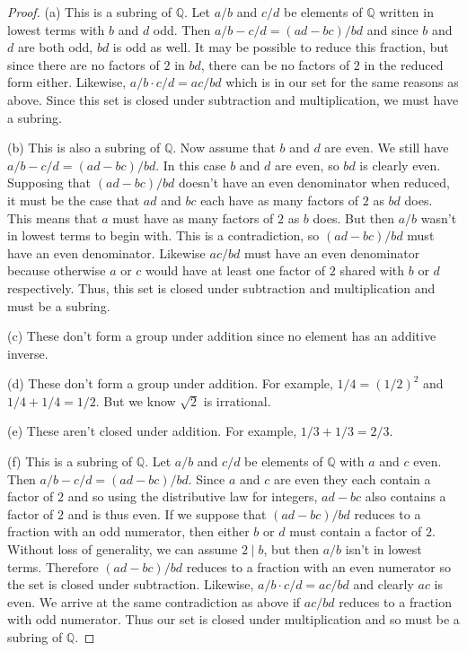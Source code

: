 \documentclass{article}
\begin{document}
\begin{proof}
(a) This is a subring of $\mathbb{Q}$. Let $a/b$ and $c/d$ be elements of $\mathbb{Q}$ written in lowest terms with $b$ and $d$ odd. Then $a/b - c/d = (ad-bc)/bd$ and since $b$ and $d$ are both odd, $bd$ is odd as well. It may be possible to reduce this fraction, but since there are no factors of $2$ in $bd$, there can be no factors of $2$ in the reduced form either. Likewise, $a/b \cdot c/d = ac/bd$ which is in our set for the same reasons as above. Since this set is closed under subtraction and multiplication, we must have a subring.

(b) This is also a subring of $\mathbb{Q}$. Now assume that $b$ and $d$ are even. We still have $a/b - c/d = (ad-bc)/bd$. In this case $b$ and $d$ are even, so $bd$ is clearly even. Supposing that $(ad-bc)/bd$ doesn't have an even denominator when reduced, it must be the case that $ad$ and $bc$ each have as many factors of $2$ as $bd$ does. This means that $a$ must have as many factors of $2$ as $b$ does. But then $a/b$ wasn't in lowest terms to begin with. This is a contradiction, so $(ad-bc)/bd$ must have an even denominator. Likewise $ac/bd$ must have an even denominator because otherwise $a$ or $c$ would have at least one factor of $2$ shared with $b$ or $d$ respectively. Thus, this set is closed under subtraction and multiplication and must be a subring.

(c) These don't form a group under addition since no element has an additive inverse.

(d) These don't form a group under addition. For example, $1/4 = (1/2)^2$ and $1/4 + 1/4 = 1/2$. But we know $\sqrt{2}$ is irrational.

(e) These aren't closed under addition. For example, $1/3 + 1/3 = 2/3$.

(f) This is a subring of $\mathbb{Q}$. Let $a/b$ and $c/d$ be elements of $\mathbb{Q}$ with $a$ and $c$ even. Then $a/b-c/d = (ad-bc)/bd$. Since $a$ and $c$ are even they each contain a factor of $2$ and so using the distributive law for integers, $ad-bc$ also contains a factor of $2$ and is thus even. If we suppose that $(ad-bc)/bd$ reduces to a fraction with an odd numerator, then either $b$ or $d$ must contain a factor of $2$. Without loss of generality, we can assume $2 \mid b$, but then $a/b$ isn't in lowest terms. Therefore $(ad-bc)/bd$ reduces to a fraction with an even numerator so the set is closed under subtraction. Likewise, $a/b \cdot c/d = ac/bd$ and clearly $ac$ is even. We arrive at the same contradiction as above if $ac/bd$ reduces to a fraction with odd numerator. Thus our set is closed under multiplication and so must be a subring of $\mathbb{Q}$.
\end{proof}
\end{document}
